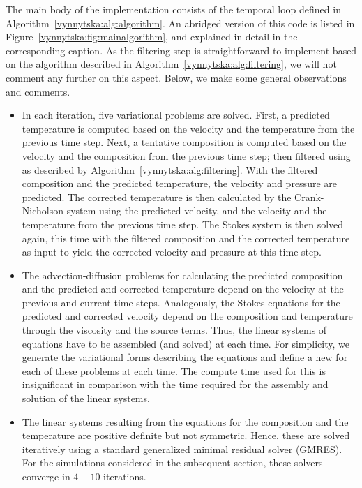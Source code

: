 The main body of the implementation consists of the temporal loop
defined in Algorithm~\ref{vynnytska:alg:algorithm}. An abridged
version of this code is listed in
Figure~\ref{vynnytska:fig:mainalgorithm}, and explained in detail in
the corresponding caption.  As the filtering step is straightforward
to implement based on the algorithm described in
Algorithm~\ref{vynnytska:alg:filtering}, we will not comment any
further on this aspect. Below, we make some general observations and
comments.
\begin{itemize}
\item
  In each iteration, five variational problems are solved. First, a
  predicted temperature is computed based on the velocity and the
  temperature from the previous time step. Next, a tentative
  composition is computed based on the velocity and the composition
  from the previous time step; then filtered using
  as described by Algorithm~\ref{vynnytska:alg:filtering}. With the filtered
  composition and the predicted temperature, the velocity and pressure are predicted.
  The corrected temperature is then calculated by the
  Crank-Nicholson system using the predicted velocity, and
  the velocity and the temperature from the previous time step. The
  Stokes system is then solved again, this time with the filtered
  composition and the corrected temperature as input to yield the
  corrected velocity and pressure at this time step.
\item
  The advection-diffusion problems for calculating the predicted
  composition and the predicted and corrected temperature depend on
  the velocity at the previous and current time steps. Analogously,
  the Stokes equations for the predicted and corrected velocity depend
  on the composition and temperature through the viscosity and the
  source terms. Thus, the linear systems of equations have to be
  assembled (and solved) at each time. For simplicity, we generate the
  variational forms describing the equations and define a
  new  for each of these problems at each
  time. The compute time used for this is insignificant in comparison
  with the time required for the assembly and solution of the linear
  systems.
\item
  The linear systems resulting from the equations for the composition
  and the temperature are positive definite but not symmetric. Hence,
  these are solved iteratively using a standard generalized minimal
  residual solver (GMRES). For the simulations considered in the
  subsequent section, these solvers converge in $4 - 10$ iterations.

\end{itemize}
